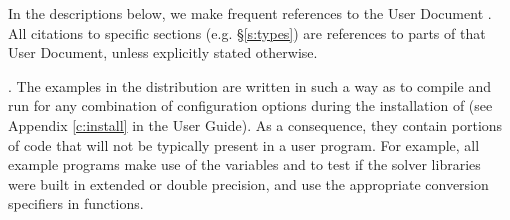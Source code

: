 In the descriptions below, we make frequent references to the {\cvode}
User Document \cite{cvode_ug}.  All citations to specific sections
(e.g. \S\ref{s:types}) are references to parts of that User Document, unless
explicitly stated otherwise.

\vspace{0.2in}.
The examples in the {\cvode} distribution are written in such a way as
to compile and run for any combination of configuration options during
the installation of {\sundials} (see Appendix \ref{c:install} in the User Guide).
As a consequence, they contain portions of code that will not be typically present in a
user program. For example, all {\CC} example programs make use of the
variables  and 
to test if the solver libraries were built in extended or double precision,
and use the appropriate conversion specifiers in  functions.
